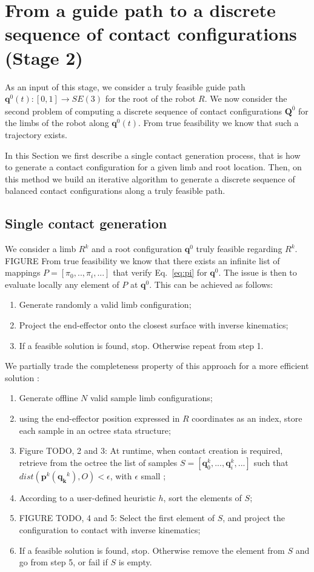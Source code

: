 \section{From a guide path to a discrete sequence of contact configurations (Stage 2)}
\label{sec:contact}
As an input of this stage, we consider a truly feasible guide path $\mathbf{q}^0(t) : [0,1] \longrightarrow SE(3)$ for the root of the robot $R$. We now consider the second problem of computing a discrete sequence of contact configurations $\mathbf{Q}^{\overline{0}}$ for the limbs of the robot along $\mathbf{q}^0(t)$. From true feasibility we know that such a trajectory exists. 

In this Section we first describe a single contact generation process, that is how to generate a contact configuration for a given limb 
and root location.
Then, on this method we build an iterative algorithm to generate a discrete sequence of balanced contact configurations along a truly feasible path.

\subsection{Single contact generation}
We consider a limb $R^k$  and a root configuration $\mathbf{q}^0$ truly feasible regarding $R^k$. FIGURE
From true feasibility we know that there exists an infinite list of mappings $P = [\pi_0,..,\pi_i, ...]$ that verify Eq.~\eqref{eq:pi} for $\mathbf{q}^0$.
The issue is then to evaluate locally any element of $P$ at $\mathbf{q}^0$.
This can be achieved as follows:
\begin{enumerate}
\item Generate randomly a valid limb configuration;
\item Project the end-effector onto the closest surface with inverse kinematics;
\item If a feasible solution is found, stop. Otherwise repeat from step 1.
\end{enumerate}

We partially trade the completeness property of this approach for a more efficient solution \citep{Tonneau2014}:
\begin{enumerate}
\item Generate offline $N$ valid sample limb configurations;
\item using the end-effector position expressed in $R$ coordinates as an index, store each sample in an octree stata structure;
\item Figure TODO, 2 and 3: At runtime, when contact creation is required, retrieve from the octree the list of samples $S = [\mathbf{q}^k_0, ..., \mathbf{q}^k_i, ...]$ such that $dist(\mathbf{p}^k(\mathbf{q_k}^k),O) < \epsilon$, with $\epsilon $ small ;
\item According to a user-defined heuristic $h$, sort the elements of $S$;
\item FIGURE TODO, 4 and 5: Select the first element of $S$, and project the configuration to contact with inverse kinematics;
\item If a feasible solution is found, stop. Otherwise remove the element from $S$ and go from step 5, or fail if $S$ is empty.
\end{enumerate}

